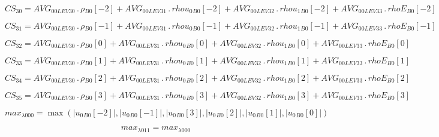 \documentclass{article}
\begin{document}
\begin{dmath}CS_{30} = AVG_{0 0 LEV 30} \,.\, {\rho{_{B0}}}[{-2}] + AVG_{0 0 LEV 31} \,.\, {rhou_{0}{_{B0}}}[{-2}] + AVG_{0 0 LEV 32} \,.\, {rhou_{1}{_{B0}}}[{-2}] + AVG_{0 0 LEV 33} \,.\, {rhoE{_{B0}}}[{-2}]\end{dmath}

\begin{dmath}CS_{31} = AVG_{0 0 LEV 30} \,.\, {\rho{_{B0}}}[{-1}] + AVG_{0 0 LEV 31} \,.\, {rhou_{0}{_{B0}}}[{-1}] + AVG_{0 0 LEV 32} \,.\, {rhou_{1}{_{B0}}}[{-1}] + AVG_{0 0 LEV 33} \,.\, {rhoE{_{B0}}}[{-1}]\end{dmath}

\begin{dmath}CS_{32} = AVG_{0 0 LEV 30} \,.\, {\rho{_{B0}}}[{0}] + AVG_{0 0 LEV 31} \,.\, {rhou_{0}{_{B0}}}[{0}] + AVG_{0 0 LEV 32} \,.\, {rhou_{1}{_{B0}}}[{0}] + AVG_{0 0 LEV 33} \,.\, {rhoE{_{B0}}}[{0}]\end{dmath}

\begin{dmath}CS_{33} = AVG_{0 0 LEV 30} \,.\, {\rho{_{B0}}}[{1}] + AVG_{0 0 LEV 31} \,.\, {rhou_{0}{_{B0}}}[{1}] + AVG_{0 0 LEV 32} \,.\, {rhou_{1}{_{B0}}}[{1}] + AVG_{0 0 LEV 33} \,.\, {rhoE{_{B0}}}[{1}]\end{dmath}

\begin{dmath}CS_{34} = AVG_{0 0 LEV 30} \,.\, {\rho{_{B0}}}[{2}] + AVG_{0 0 LEV 31} \,.\, {rhou_{0}{_{B0}}}[{2}] + AVG_{0 0 LEV 32} \,.\, {rhou_{1}{_{B0}}}[{2}] + AVG_{0 0 LEV 33} \,.\, {rhoE{_{B0}}}[{2}]\end{dmath}

\begin{dmath}CS_{35} = AVG_{0 0 LEV 30} \,.\, {\rho{_{B0}}}[{3}] + AVG_{0 0 LEV 31} \,.\, {rhou_{0}{_{B0}}}[{3}] + AVG_{0 0 LEV 32} \,.\, {rhou_{1}{_{B0}}}[{3}] + AVG_{0 0 LEV 33} \,.\, {rhoE{_{B0}}}[{3}]\end{dmath}

\begin{dmath}max_{\lambda 0 00} = \max\left(\left|{{u_{0}{_{B0}}}[{-2}]}\right|, \left|{{u_{0}{_{B0}}}[{-1}]}\right|, \left|{{u_{0}{_{B0}}}[{3}]}\right|, \left|{{u_{0}{_{B0}}}[{2}]}\right|, \left|{{u_{0}{_{B0}}}[{1}]}\right|, 
\left|{{u_{0}{_{B0}}}[{0}]}\right|\right)\end{dmath}

\begin{dmath}max_{\lambda 0 11} = max_{\lambda 0 00}\end{dmath}
\end{document}
